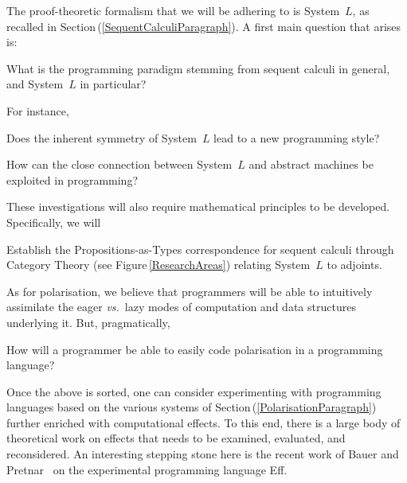 \documentclass[11pt,twocolumn]{article}
\newcounter{CC}
\newenvironment{resenumerate}
  {\begin{list}{[\textbf{\arabic{CC}]}}
  {\usecounter{CC}
   \setlength{\topsep}{2pt}
   \setlength{\partopsep}{2pt}
   \setlength{\itemsep}{2.5pt}
   \setlength{\parsep}{2.5pt}
   \setlength{\leftmargin}{1.65em}
   \setlength{\labelwidth}{1.15em}
 }}
  {\end{list}}
\newcommand{\pref}[1]{\,(\ref{#1})}
\newcommand{\vs}{\emph{vs.}}
\newcommand{\SystemL}{\mbox{System~$L$}}
\begin{document}
The proof-theoretic formalism that we will be adhering to is {\SystemL},
as recalled in Section\pref{SequentCalculiParagraph}.  A first main
question that arises is:
\begin{resenumerate}\setcounter{CC}{0}
\item 
  What is the programming paradigm stemming from sequent calculi in
  general, and {\SystemL} in particular?
\end{resenumerate}
For instance, 
\begin{resenumerate}\setcounter{CC}{1}
\item
  Does the inherent symmetry of {\SystemL} lead to a new programming
  style?

\item
  How can the close connection between {\SystemL} and abstract machines be
  exploited in programming?
\end{resenumerate}
These investigations will also require mathematical principles to be
developed.  Specifically, we will 
\begin{resenumerate}\setcounter{CC}{3}
\item
  Establish the Propositions-as-Types correspondence for sequent calculi
  through Category Theory (see Figure\,\ref{ResearchAreas}) relating
  {\SystemL} to adjoints.
\end{resenumerate}

As for polarisation, we believe that programmers will be able to intuitively
assimilate the eager {\vs}~lazy modes of computation and data structures
underlying it.  But, pragmatically,
\begin{resenumerate}\setcounter{CC}{4}
\item
  How will a programmer be able to easily code polarisation in a
  programming language?
\end{resenumerate}

Once the above is sorted, one can consider experimenting with programming
languages based on the various systems of
Section\pref{PolarisationParagraph} further enriched with computational
effects.  To this end, there is a large body of theoretical work on
effects that needs to be examined, evaluated, and reconsidered.  An
interesting stepping stone here is the recent work of Bauer and
Pretnar~\cite{BauerPretnar} on the experimental programming language Eff.  
\end{document}
